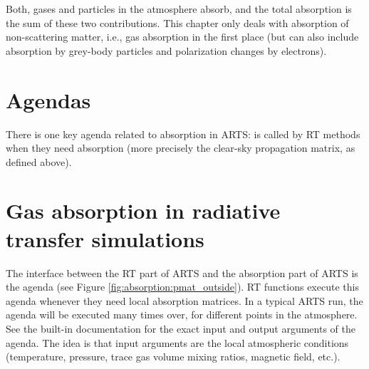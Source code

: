 Both, gases and particles in the atmosphere absorb, and the total absorption is
the sum of these two contributions.
This chapter only deals with absorption of non-scattering matter, i.e., gas
absorption in the first place (but can also include absorption by grey-body
particles and polarization changes by electrons).

\section{Agendas}
\label{sec:absorption:agendas}

There is one key agenda related to absorption in ARTS:
 is called by RT methods when they
need absorption (more precisely the clear-sky propagation matrix, as
defined above).


\section{Gas absorption in radiative transfer simulations}
\label{sec:absorption:abs-rt}

The interface between the RT part of ARTS and the absorption part of
ARTS is the agenda  (see Figure
\ref{fig:absorption:pmat_outside}). RT functions execute this agenda
whenever they need local absorption matrices. In a typical ARTS run,
the agenda will be executed many times over, for different points in
the atmosphere. See the built-in documentation for the exact input and
output arguments of the agenda. The idea is that input arguments are
the local atmospheric conditions (temperature, pressure, trace gas
volume mixing ratios, magnetic field, etc.).

